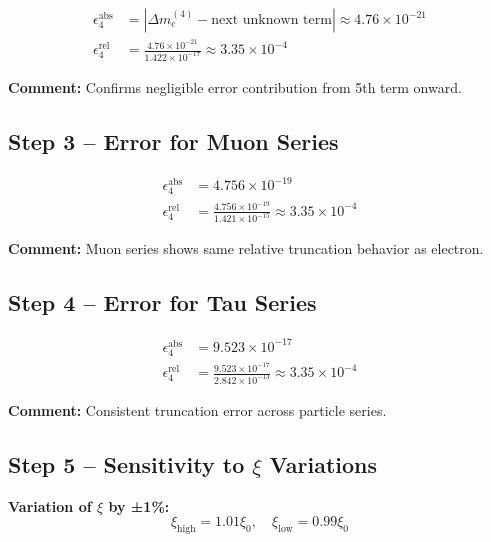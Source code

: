 \documentclass[12pt,a4paper]{article}
\begin{document}
\begin{align}
	\epsilon_4^\text{abs} &= |\Delta m_e^{(4)} - \text{next unknown term}| \approx 4.76 \times 10^{-21} \\
	\epsilon_4^\text{rel} &= \frac{4.76 \times 10^{-21}}{1.422 \times 10^{-17}} \approx 3.35 \times 10^{-4}
\end{align}

\textbf{Comment:} Confirms negligible error contribution from 5th term onward.

\subsection{Step 3 – Error for Muon Series}

\begin{align}
	\epsilon_4^\text{abs} &= 4.756 \times 10^{-19} \\
	\epsilon_4^\text{rel} &= \frac{4.756 \times 10^{-19}}{1.421 \times 10^{-15}} \approx 3.35 \times 10^{-4}
\end{align}

\textbf{Comment:} Muon series shows same relative truncation behavior as electron.

\subsection{Step 4 – Error for Tau Series}

\begin{align}
	\epsilon_4^\text{abs} &= 9.523 \times 10^{-17} \\
	\epsilon_4^\text{rel} &= \frac{9.523 \times 10^{-17}}{2.842 \times 10^{-13}} \approx 3.35 \times 10^{-4}
\end{align}

\textbf{Comment:} Consistent truncation error across particle series.

\subsection{Step 5 – Sensitivity to $\xi$ Variations}

\textbf{Variation of $\xi$ by ±1\%:}
\begin{equation}
	\xi_\text{high} = 1.01 \xi_0, \quad \xi_\text{low} = 0.99 \xi_0
\end{equation}
\end{document}
